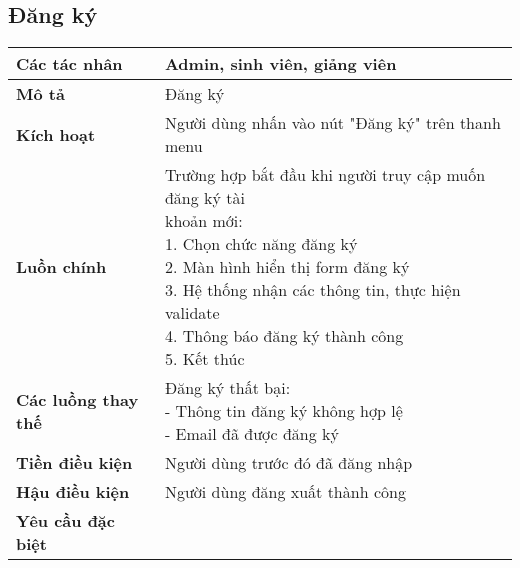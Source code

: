\subsection{Đăng ký}
\begin{tabular}{|l|p{}|}
	\hline
	\textbf{Các tác nhân}       & Admin, sinh viên, giảng viên                                        \\
	\hline
	\textbf{Mô tả}              & Đăng ký                                                             \\
	\hline
	\textbf{Kích hoạt}          & Người dùng nhấn vào nút "Đăng ký" trên thanh menu                   \\
	\hline
	\textbf{Luồn chính}         & \makecell[l]{Trường hợp bắt đầu khi người truy cập muốn đăng ký tài \\khoản mới: \\ 1. Chọn chức năng đăng ký \\ 2. Màn hình hiển thị form đăng ký \\ 3. Hệ thống nhận các thông tin, thực hiện validate \\ 4. Thông báo đăng ký thành công \\ 5. Kết thúc} \\
	\hline
	\textbf{Các luồng thay thế} & \makecell[l]{Đăng ký thất bại:                                      \\ - Thông tin đăng ký không hợp lệ \\ - Email đã được đăng ký} \\
	\hline
	\textbf{Tiền điều kiện}     & Người dùng trước đó đã đăng nhập                                    \\
	\hline
	\textbf{Hậu điều kiện}      & Người dùng đăng xuất thành công                                     \\
	\hline
	\textbf{Yêu cầu đặc biệt}   &                                                                     \\
	\hline
\end{tabular}

